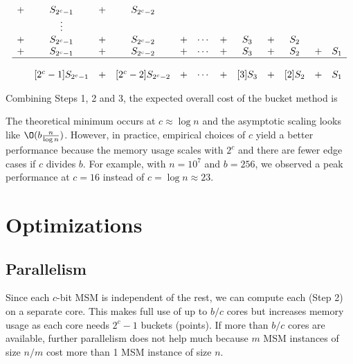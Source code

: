 \documentclass[journal=tches,spthm]{iacrtrans}
\begin{document}
\begin{enumerate}
$$\begin{array}{cccccccccccc}
            + & S_{2^c-1} & + & S_{2^c-2} &  &  &  &  &  &  &  &  \\
              & \vdots &  &  &  &  &  &  &  &  &  &  \\
            + & S_{2^c-1} & + & S_{2^c-2} & + & \cdots & + & S_3 & + & S_2 &  &  \\
            + & S_{2^c-1} & + & S_{2^c-2} & + & \cdots & + & S_3 & + & S_2 & + & S_1 \\
              \cline{1-12}
              &  &   &  &  &  &  &  &  &  &  &  \\
              & [2^c-1]S_{2^c-1} & + & [2^c-2]S_{2^c-2} & + & \cdots & + & [3]S_3 & + & [2]S_2 & + & S_1 \\
        \end{array}$$
    \begin{center}
    \end{center}
\end{enumerate}

\begin{center}
\end{center}


Combining Steps 1, 2 and 3, the expected overall cost of the bucket method is
\begin{center}
\end{center}

\begin{remark}[On choosing $c$]
    The theoretical minimum occurs at $c \approx \log n$ and the asymptotic
    scaling looks like $\O(b\frac{n}{\log n})$. However, in practice, empirical
    choices of $c$ yield a better performance because the memory usage scales
    with $2^c$ and there are fewer edge cases if $c$ divides $b$. For example,
    with $n=10^7$ and $b=256$, we observed a peak performance at $c=16$ instead
    of $c = \log n \approx 23$.
\end{remark}

\section{Optimizations}
\label{sec:optimizations}
\subsection{Parallelism}
Since each $c$-bit MSM is independent of the rest, we can compute each (Step 2)
on a separate core. This makes full use of up to $b/c$ cores but increases
memory usage as each core needs $2^c-1$ buckets (points). If more than $b/c$ cores are
available, further parallelism does not help much because $m$ MSM instances of
size $n/m$ cost more than 1 MSM instance of size $n$.
\end{document}
